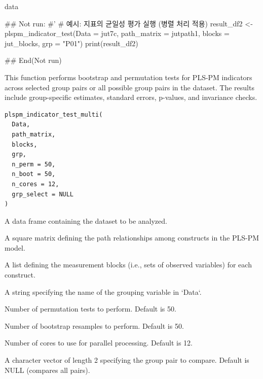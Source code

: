 \documentclass[a4paper]{book}
\begin{document}
%
\begin{Value}
data
\end{Value}
%
\begin{Examples}
\begin{ExampleCode}

\#\# Not run: 
#'
# 예시: 지표의 균일성 평가 실행 (병렬 처리 적용)
result_df2 <- plspm_indicator_test(Data = jut7c, path_matrix = jutpath1, blocks = jut_blocks, grp = "P01")
print(result_df2)

## End(Not run)

\end{ExampleCode}
\end{Examples}
%
\begin{Description}
This function performs bootstrap and permutation tests for PLS-PM indicators across
selected group pairs or all possible group pairs in the dataset. The results include
group-specific estimates, standard errors, p-values, and invariance checks.
\end{Description}
%
\begin{Usage}
\begin{verbatim}
plspm_indicator_test_multi(
  Data,
  path_matrix,
  blocks,
  grp,
  n_perm = 50,
  n_boot = 50,
  n_cores = 12,
  grp_select = NULL
)
\end{verbatim}
\end{Usage}
%
\begin{Arguments}
\begin{ldescription}
\item[\code{Data}] A data frame containing the dataset to be analyzed.

\item[\code{path\_matrix}] A square matrix defining the path relationships among constructs in the PLS-PM model.

\item[\code{blocks}] A list defining the measurement blocks (i.e., sets of observed variables) for each construct.

\item[\code{grp}] A string specifying the name of the grouping variable in `Data`.

\item[\code{n\_perm}] Number of permutation tests to perform. Default is 50.

\item[\code{n\_boot}] Number of bootstrap resamples to perform. Default is 50.

\item[\code{n\_cores}] Number of cores to use for parallel processing. Default is 12.

\item[\code{grp\_select}] A character vector of length 2 specifying the group pair to compare. Default is NULL (compares all pairs).
\end{ldescription}
\end{Arguments}
\end{document}

